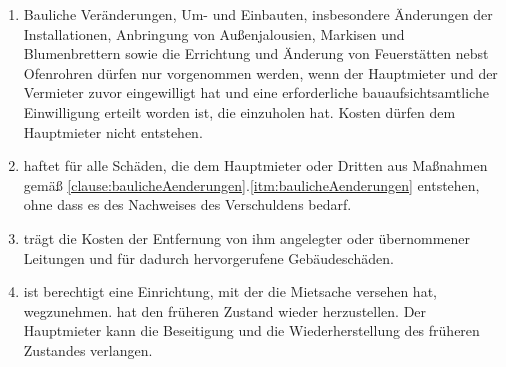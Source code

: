 \documentclass{scrreprt}[12pt,a4paper,twoside,duplex]
\begin{document}
\begin{contract}
\label{clause:baulicheAenderungen}
\begin{enumerate}
	\item Bauliche Veränderungen, Um- und Einbauten, insbesondere Änderungen der Installationen, Anbringung von Au{\ss}enjalousien, Markisen und Blumenbrettern sowie die Errichtung und Änderung von Feuerstätten nebst Ofenrohren dürfen nur vorgenommen werden, wenn der Hauptmieter und der Vermieter zuvor eingewilligt hat und eine erforderliche bauaufsichtsamtliche Einwilligung erteilt worden ist, die  einzuholen hat. Kosten dürfen dem Hauptmieter nicht entstehen. \label{itm:baulicheAenderungen}

	\item {} haftet für alle Schäden, die dem Hauptmieter oder Dritten aus Ma{\ss}nahmen gemä{\ss} \ref{clause:baulicheAenderungen}.\ref{itm:baulicheAenderungen} entstehen, ohne dass es des Nachweises des Verschuldens bedarf.

	\item {} trägt die Kosten der Entfernung von ihm angelegter oder übernommener Leitungen und für dadurch hervorgerufene Gebäudeschäden.
	
	\item {} ist berechtigt eine Einrichtung, mit der  die Mietsache versehen hat, wegzunehmen.  hat den früheren Zustand wieder herzustellen. Der Hauptmieter kann die Beseitigung und die Wiederherstellung des früheren Zustandes verlangen.
\end{enumerate}
\end{contract}
\end{document}
